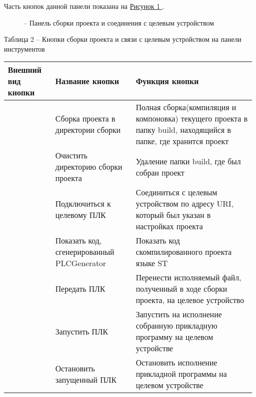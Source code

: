 \documentclass[letterpaper,10pt,russian]{sphinxmanual}
\begin{document}
Часть кнопок данной панели показана на \hyperref[usage_guide/ide_components:image14]{Рисунок \ref{usage_guide/ide_components:image14} }.
\begin{figure}[htbp]
\centering
\capstart

\noindent{}
\caption{– Панель сборки проекта и соединения с целевым устройством}\label{usage_guide/ide_components:image14}\end{figure}

Таблица 2 – Кнопки сборки проекта и связи с целевым устройством на
панели инструментов

\noindent\begin{tabulary}{\linewidth}{|L|L|L|}
\hline
\textsf{\relax 
Внешний вид кнопки
\unskip}\relax &\textsf{\relax 
Название кнопки
\unskip}\relax &\textsf{\relax 
Функция кнопки
\unskip}\relax \\
\hline
{}
&
Сборка проекта в
директории сборки
&
Полная
сборка(компиляция и
компоновка) текущего
проекта в папку
build, находящийся в
папке, где хранится
проект
\\
\hline
{}
&
Очистить директорию
сборки проекта
&
Удаление папки build,
где был собран проект
\\
\hline
{}
&
Подключиться к
целевому ПЛК
&
Соединиться с целевым
устройством по адресу
URI, который был
указан в настройках
проекта
\\
\hline
{}
&
Показать код,
сгенерированный
PLCGenerator
&
Показать код
скомпилированного
проекта языке ST
\\
\hline
{}
&
Передать ПЛК
&
Перенести исполняемый
файл, полученный в
ходе сборки проекта,
на целевое устройство
\\
\hline
{}
&
Запустить ПЛК
&
Запустить на
исполнение собранную
прикладную программу
на целевом устройстве
\\
\hline
{}
&
Остановить запущенный
ПЛК
&
Остановить исполнение
прикладной программы
на целевом устройстве
\\
\hline\end{tabulary}
\end{document}
